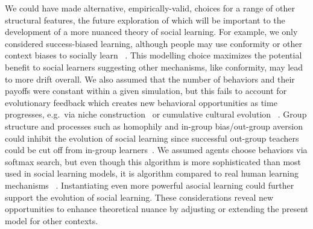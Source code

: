 \documentclass[letterpaper,11.5pt]{scrartcl}
\begin{document}
We could have made alternative, empirically-valid, choices for a range of other structural features, the future exploration of which will be important to the development of a more nuanced theory of social learning.  %
For example, we only considered success-biased
learning, although people may use conformity or other context biases to socially learn ~\cite{BoydRicherson1985,Muthukrishna2016a,Smaldino2018b}.  This modelling choice maximizes the potential benefit to social learners suggesting other mechanisms, like conformity, may lead to more drift overall. We also assumed that the number of behaviors and
their payoffs were constant within a given simulation, but this fails to account for evolutionary feedback which creates new behavioral opportunities as time progresses, e.g.\ via niche construction~\cite{Smaldino2012a,Heras-Escribano2020} or cumulative cultural evolution
~\cite{Smolla2019,Derex2020}.  Group structure
and processes such as homophily and in-group bias/out-group aversion could inhibit the
evolution of social learning since successful out-group teachers could be cut off from
in-group learners~\cite{Golub2012}. We assumed agents choose behaviors via softmax
search, but even though this algorithm is more sophisticated than most used in social learning models, it is algorithm compared to real human learning mechanisms ~\cite{Schulz2020a,Wu2022}. Instantiating even more powerful asocial learning could further
support the evolution of social learning. These considerations reveal new opportunities to enhance theoretical nuance by adjusting or extending the present model for other contexts. 


\end{document}
